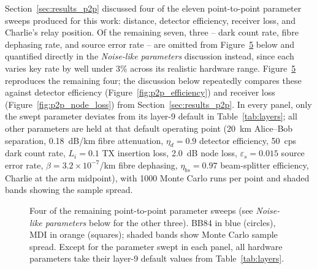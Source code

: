 \documentclass[12pt]{article}
\begin{document}
Section~\ref{sec:results_p2p} discussed four of the eleven point-to-point parameter sweeps produced for this work: distance, detector efficiency, receiver loss, and Charlie's relay position. Of the remaining seven, three -- dark count rate, fibre dephasing rate, and source error rate -- are omitted from Figure~\ref{fig:appx_grid} below and quantified directly in the \textit{Noise-like parameters} discussion instead, since each varies key rate by well under 3\% across its realistic hardware range. Figure~\ref{fig:appx_grid} reproduces the remaining four; the discussion below repeatedly compares these against detector efficiency (Figure~\ref{fig:p2p_efficiency}) and receiver loss (Figure~\ref{fig:p2p_node_loss}) from Section~\ref{sec:results_p2p}. In every panel, only the swept parameter deviates from its layer-9 default in Table~\ref{tab:layers}; all other parameters are held at that default operating point (20~km Alice--Bob separation, 0.18~dB/km fibre attenuation, $\eta_d = 0.9$ detector efficiency, 50~cps dark count rate, $L_i = 0.1$ TX insertion loss, 2.0~dB node loss, $\varepsilon_s = 0.015$ source error rate, $\beta = 3.2\times10^{-7}$/km fibre dephasing, $\eta_{bs} = 0.97$ beam-splitter efficiency, Charlie at the arm midpoint), with 1000 Monte Carlo runs per point and shaded bands showing the sample spread.

\begin{figure}[t]
    \centering
    \begin{subfigure}[t]{0.48\textwidth}
        \centering
        
        \label{fig:appx_loss}
    \end{subfigure}%
    \begin{subfigure}[t]{0.48\textwidth}
        \centering
        \raisebox{1.44pt}{}
        \label{fig:appx_bs_eff}
    \end{subfigure}

    \begin{subfigure}[t]{0.48\textwidth}
        \centering
        
        \label{fig:appx_init_loss}
    \end{subfigure}%
    \begin{subfigure}[t]{0.48\textwidth}
        \centering
        \raisebox{1.44pt}{}
        \label{fig:appx_basis_bias}
    \end{subfigure}
    \caption{Four of the remaining point-to-point parameter sweeps (see \textit{Noise-like parameters} below for the other three). BB84 in blue (circles), MDI in orange (squares); shaded bands show Monte Carlo sample spread. Except for the parameter swept in each panel, all hardware parameters take their layer-9 default values from Table~\ref{tab:layers}.}
    \label{fig:appx_grid}
\end{figure}
\end{document}
